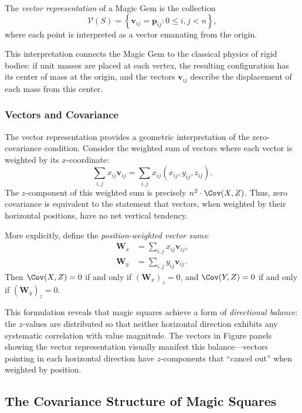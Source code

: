 \begin{definition}
The \emph{vector representation} of a Magic Gem is the collection
\[
\mathcal{V}(S) = \left\{ \mathbf{v}_{ij} = \mathbf{p}_{ij} : 0 \leq i, j < n \right\},
\]
where each point is interpreted as a vector emanating from the origin.
\end{definition}

This interpretation connects the Magic Gem to the classical physics of rigid bodies:
if unit masses are placed at each vertex, the resulting configuration has its center of mass at the origin,
and the vectors $\mathbf{v}_{ij}$ describe the displacement of each mass from this center.

\subsubsection{Vectors and Covariance}

The vector representation provides a geometric interpretation of the zero-covariance condition.
Consider the weighted sum of vectors where each vector is weighted by its $x$-coordinate:
\[
\sum_{i,j} x_{ij} \mathbf{v}_{ij} = \sum_{i,j} x_{ij} (x_{ij}, y_{ij}, z_{ij}).
\]
The $z$-component of this weighted sum is precisely $n^2 \cdot \Cov(X, Z)$.
Thus, zero covariance is equivalent to the statement that vectors, 
when weighted by their horizontal positions, have no net vertical tendency.

More explicitly, define the \emph{position-weighted vector sums}:
\begin{align}
\mathbf{W}_x &= \sum_{i,j} x_{ij} \mathbf{v}_{ij}, \label{eq:weighted_x} \\
\mathbf{W}_y &= \sum_{i,j} y_{ij} \mathbf{v}_{ij}. \label{eq:weighted_y}
\end{align}
Then $\Cov(X, Z) = 0$ if and only if $(\mathbf{W}_x)_z = 0$, 
and $\Cov(Y, Z) = 0$ if and only if $(\mathbf{W}_y)_z = 0$.

This formulation reveals that magic squares achieve a form of \emph{directional balance}:
the $z$-values are distributed so that neither horizontal direction 
exhibits any systematic correlation with value magnitude.
The vectors in Figure panels showing the vector representation 
visually manifest this balance---vectors pointing in each horizontal direction 
have $z$-components that ``cancel out'' when weighted by position.

\subsection{The Covariance Structure of Magic Squares}
\label{sec:zero_cov_theorem}

